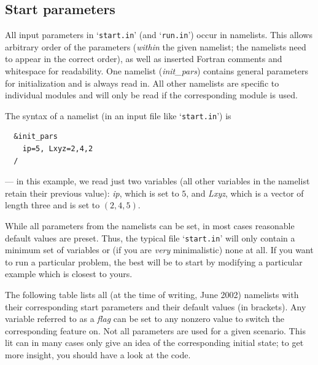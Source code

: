 \documentclass[12pt,twoside,notitlepage,a4paper]{article}
\makeatletter
\newcommand{\var}[1]{\textsl{#1}\index{#1@\emph{#1}}\/}
\newcommand{\file}[1]{`\texttt{#1}'}
\newcommand{\dfn}[1]{\textsl{#1}\index{#1}\/}
\newcommand{\name}[1]{\textsl{#1}\index{#1}\/}
\makeatother
\begin{document}


\subsection{Start parameters}
\label{start-params}

All input parameters in \file{start.in} (and \file{run.in}) occur in
namelists.
This allows arbitrary order of the parameters (\emph{within} the given
namelist; the namelists need to appear in the correct order), as well as
inserted Fortran comments and whitespace for readability.
One namelist (\name{init_pars}) contains general parameters for
initialization and is always read in.
All other namelists are specific to individual modules and will only
be read if the corresponding module is used.

The syntax of a namelist (in an input file like \file{start.in}) is
\begin{verbatim}
  &init_pars
    ip=5, Lxyz=2,4,2
  /
\end{verbatim}
--- in this example, we read just two variables (all other variables in
the namelist retain their previous value): \var{ip}, which is set to $5$,
and \var{Lxyz}, which is a vector of length three and is set to $(2,4,5)$.

While all parameters from the namelists can be set, in most cases
reasonable default values are preset.
Thus, the typical file \file{start.in} will only contain a minimum set of
variables or (if you are \emph{very} minimalistic) none at all.
If you want to run a particular problem, the best will be to start by
modifying a particular example which is closest to yours.

The following table lists all (at the time of writing, June 2002)
namelists with their corresponding start parameters and their default
values (in brackets).
Any variable referred to as a \dfn{flag} can be set to any nonzero value
to switch the corresponding feature on.
Not all parameters are used for a given scenario.
This lit can in many cases only give an idea of the corresponding initial
state; to get more insight, you should have a look at the code.
\end{document}

